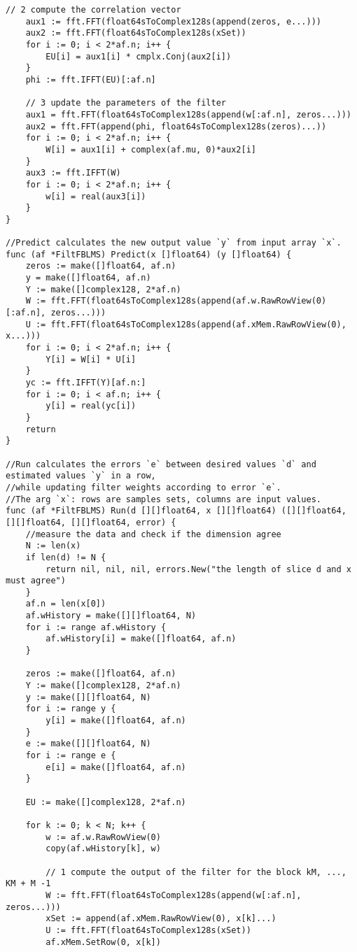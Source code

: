 \begin{lstlisting}[caption=fblms.go,label=fblms.go]
	// 2 compute the correlation vector
	aux1 := fft.FFT(float64sToComplex128s(append(zeros, e...)))
	aux2 := fft.FFT(float64sToComplex128s(xSet))
	for i := 0; i < 2*af.n; i++ {
		EU[i] = aux1[i] * cmplx.Conj(aux2[i])
	}
	phi := fft.IFFT(EU)[:af.n]

	// 3 update the parameters of the filter
	aux1 = fft.FFT(float64sToComplex128s(append(w[:af.n], zeros...)))
	aux2 = fft.FFT(append(phi, float64sToComplex128s(zeros)...))
	for i := 0; i < 2*af.n; i++ {
		W[i] = aux1[i] + complex(af.mu, 0)*aux2[i]
	}
	aux3 := fft.IFFT(W)
	for i := 0; i < 2*af.n; i++ {
		w[i] = real(aux3[i])
	}
}

//Predict calculates the new output value `y` from input array `x`.
func (af *FiltFBLMS) Predict(x []float64) (y []float64) {
	zeros := make([]float64, af.n)
	y = make([]float64, af.n)
	Y := make([]complex128, 2*af.n)
	W := fft.FFT(float64sToComplex128s(append(af.w.RawRowView(0)[:af.n], zeros...)))
	U := fft.FFT(float64sToComplex128s(append(af.xMem.RawRowView(0), x...)))
	for i := 0; i < 2*af.n; i++ {
		Y[i] = W[i] * U[i]
	}
	yc := fft.IFFT(Y)[af.n:]
	for i := 0; i < af.n; i++ {
		y[i] = real(yc[i])
	}
	return
}

//Run calculates the errors `e` between desired values `d` and estimated values `y` in a row,
//while updating filter weights according to error `e`.
//The arg `x`: rows are samples sets, columns are input values.
func (af *FiltFBLMS) Run(d [][]float64, x [][]float64) ([][]float64, [][]float64, [][]float64, error) {
	//measure the data and check if the dimension agree
	N := len(x)
	if len(d) != N {
		return nil, nil, nil, errors.New("the length of slice d and x must agree")
	}
	af.n = len(x[0])
	af.wHistory = make([][]float64, N)
	for i := range af.wHistory {
		af.wHistory[i] = make([]float64, af.n)
	}

	zeros := make([]float64, af.n)
	Y := make([]complex128, 2*af.n)
	y := make([][]float64, N)
	for i := range y {
		y[i] = make([]float64, af.n)
	}
	e := make([][]float64, N)
	for i := range e {
		e[i] = make([]float64, af.n)
	}

	EU := make([]complex128, 2*af.n)

	for k := 0; k < N; k++ {
		w := af.w.RawRowView(0)
		copy(af.wHistory[k], w)

		// 1 compute the output of the filter for the block kM, ..., KM + M -1
		W := fft.FFT(float64sToComplex128s(append(w[:af.n], zeros...)))
		xSet := append(af.xMem.RawRowView(0), x[k]...)
		U := fft.FFT(float64sToComplex128s(xSet))
		af.xMem.SetRow(0, x[k])


\end{lstlisting}
